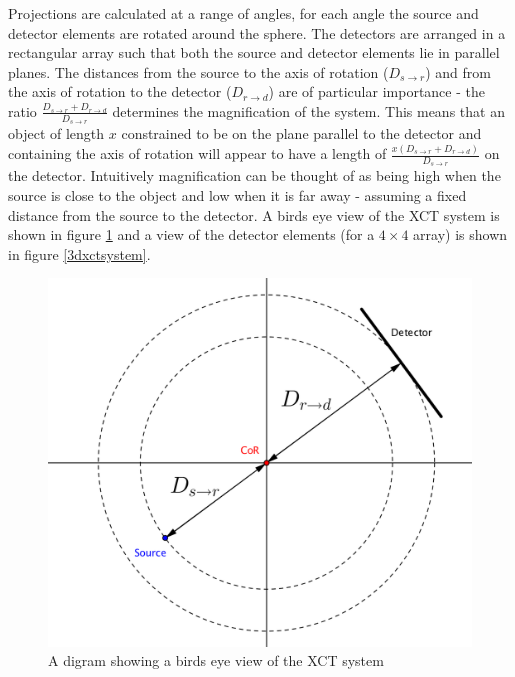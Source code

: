 \documentclass[
  twoside,
  11pt, a4paper,
  footinclude=true,
  headinclude=true,
  cleardoublepage=empty
]{scrbook}
\begin{document}
Projections are calculated at a range of angles, for each angle the source and detector elements are rotated around the sphere. The detectors are arranged in a rectangular array such that both the source and detector elements lie in parallel planes. The distances from the source to the axis of rotation ($D_{s\rightarrow r}$) and from the axis of rotation to the detector ($D_{r \rightarrow d}$) are of particular importance - the ratio $\frac{D_{s\rightarrow r}+D_{r \rightarrow d}}{D_{s\rightarrow r}}$ determines the magnification of the system. This means that an object of length $x$ constrained to be on the plane parallel to the detector and containing the axis of rotation will appear to have a length of $\frac{x(D_{s\rightarrow r}+D_{r \rightarrow d})}{D_{s\rightarrow r}}$ on the detector. Intuitively magnification can be thought of as being high when the source is close to the object and low when it is far away - assuming a fixed distance from the source to the detector. A birds eye view of the XCT system is shown in figure \ref{xctsystem} and a view of the detector elements (for a $4\times4$ array) is shown in figure \ref{3dxctsystem}.

\begin{figure}[h!]
  \centering
    \includegraphics[width=\textwidth]{figures/XCTsystem.png}
    \caption{A digram showing a birds eye view of the XCT system}
    \label{xctsystem}
\end{figure}
\end{document}
